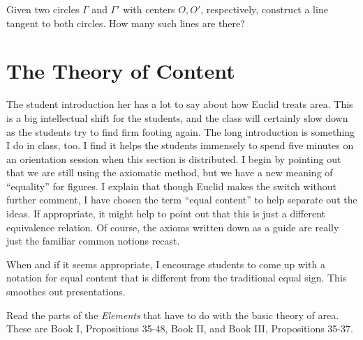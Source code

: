 \begin{challenge}\label{chal:double-tangent}
Given two circles $\Gamma$ and $\Gamma'$ with centers $O, O'$, respectively, construct a line tangent to both circles.
How many such lines are there?
\end{challenge}



\chapter{The Theory of Content}

\begin{annotation}
{
\color{blue}
The student introduction her has a lot to say about how Euclid treats area. This is a big intellectual shift for the students, and the class will certainly slow down as the students try to find firm footing again. The long introduction is something I do in class, too. I find it helps the students immensely to spend five minutes on an orientation session when this section is distributed. I begin by pointing out that we are still using the axiomatic method, but we have a new meaning of ``equality'' for figures. I explain that though Euclid makes the switch without further comment, I have chosen the term ``equal content'' to help separate out the ideas. If appropriate, it might help to point out that this is just a different equivalence relation. Of course, the axioms written down as a guide are really just the familiar common notions recast.

When and if it seems appropriate, I encourage students to come up with a notation for equal content that is different from the traditional equal sign. This smoothes out presentations.
}
\end{annotation}


Read the parts of the \emph{Elements} that have to do with the basic theory of area. These are Book I, Propositions 35-48, Book II, and Book III, Propositions 35-37.

